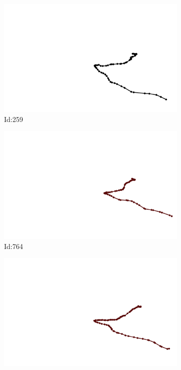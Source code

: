 \documentclass[12pt,twoside]{report}
\begin{document}
\begin{figure}
\centering
\begin{subfigure}[b]{0.20\textwidth}
\centering
\includegraphics[width=\textwidth]{../../trajectories/259.png}
\caption{Id:259}
\end{subfigure}
\begin{subfigure}[b]{0.20\textwidth}
\centering
\includegraphics[width=\textwidth]{../../trajectories/764.png}
\caption{Id:764}
\end{subfigure}
\begin{subfigure}[b]{0.20\textwidth}
\centering
\includegraphics[width=\textwidth]{../../trajectories/771.png}

\end{subfigure}
\end{figure}
\end{document}
